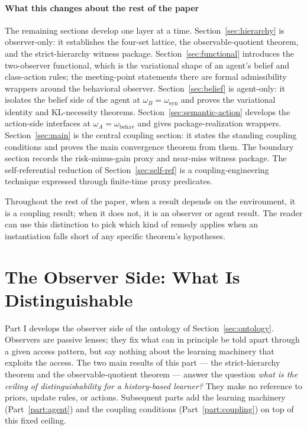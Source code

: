 \documentclass[11pt]{article}
\theoremstyle{definition}
\theoremstyle{remark}
\theoremstyle{plain}
\theoremstyle{definition}
\begin{document}
\subsection{What this changes about the rest of the paper}
\label{sec:ontology-roadmap}

The remaining sections develop one layer at a time. Section~\ref{sec:hierarchy} is observer-only: it establishes the four-set lattice, the observable-quotient theorem, and the strict-hierarchy witness package. Section~\ref{sec:functional} introduces the two-observer functional, which is the variational shape of an agent's belief and class-action rules; the meeting-point statements there are formal admissibility wrappers around the behavioral observer. Section~\ref{sec:belief} is agent-only: it isolates the belief side of the agent at $\omega_B=\omega_{\mathrm{syn}}$ and proves the variational identity and KL-necessity theorems. Section~\ref{sec:semantic-action} develops the action-side interfaces at $\omega_A=\omega_{\mathrm{behav}}$ and gives package-realization wrappers. Section~\ref{sec:main} is the central coupling section: it states the standing coupling conditions and proves the main convergence theorem from them. The boundary section records the risk-minus-gain proxy and near-miss witness package. The self-referential reduction of Section~\ref{sec:self-ref} is a coupling-engineering technique expressed through finite-time proxy predicates.

Throughout the rest of the paper, when a result depends on the environment, it is a coupling result; when it does not, it is an observer or agent result. The reader can use this distinction to pick which kind of remedy applies when an instantiation falls short of any specific theorem's hypotheses.

\part{The Observer Side: What Is Distinguishable}
\label{part:observer}

Part I develops the observer side of the ontology of Section~\ref{sec:ontology}. Observers are passive lenses; they fix what can in principle be told apart through a given access pattern, but say nothing about the learning machinery that exploits the access. The two main results of this part --- the strict-hierarchy theorem and the observable-quotient theorem --- answer the question \emph{what is the ceiling of distinguishability for a history-based learner?} They make no reference to priors, update rules, or actions. Subsequent parts add the learning machinery (Part~\ref{part:agent}) and the coupling conditions (Part~\ref{part:coupling}) on top of this fixed ceiling.
\end{document}
